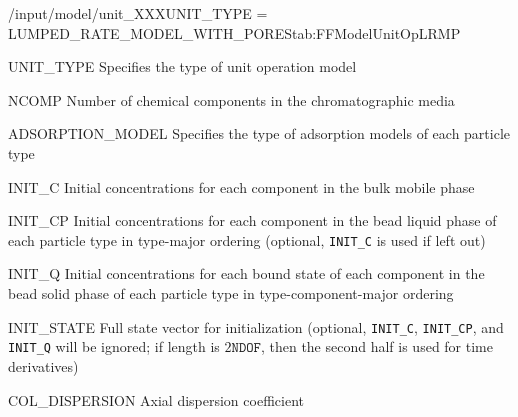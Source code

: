 \begin{condsubgroup}{/input/model/unit\_XXX}{UNIT\_TYPE = LUMPED\_RATE\_MODEL\_WITH\_PORES}{tab:FFModelUnitOpLRMP}
  \begin{dataset}[type=string,range={\texttt{LUMPED\_RATE\_MODEL\_WITH\_PORES}},length=1]{UNIT\_TYPE}
    Specifies the type of unit operation model
  \end{dataset}
  \begin{dataset}[type=int,range={$\geq 1$},length=1]{NCOMP}
    Number of chemical components in the chromatographic media
  \end{dataset}
  \begin{dataset}[type=string,range={See Section~\ref{sec:FFAdsorption}},length={\texttt{NPARTYPE}}]{ADSORPTION\_MODEL}
    Specifies the type of adsorption models of each particle type
  \end{dataset}
  \begin{dataset}[unit=\si{\mol\per\cubic\metre\of{IV}},type=double,range={$\geq 0$},length={\texttt{NCOMP}}]{INIT\_C}
    Initial concentrations for each component in the bulk mobile phase
  \end{dataset}
  \begin{dataset}[unit=\si{\mol\per\cubic\metre\of{MP}},type=double,range={$\geq 0$},length={$\texttt{NPARTYPE} \cdot \texttt{NCOMP}$}]{INIT\_CP}
    Initial concentrations for each component in the bead liquid phase of each particle type in type-major ordering (optional, \texttt{INIT\_C} is used if left out)
  \end{dataset}
  \begin{dataset}[unit=\si{\mol\per\cubic\metre\of{SP}},type=double,range={$\geq 0$},length={\texttt{NTOTALBND}}]{INIT\_Q}
    Initial concentrations for each bound state of each component in the bead solid phase of each particle type in type-component-major ordering
  \end{dataset}
  \begin{dataset}[unit=various,type=double,range={$\mathds{R}$},length={\texttt{NDOF} / $2\texttt{NDOF}$}]{INIT\_STATE}
    Full state vector for initialization (optional, \texttt{INIT\_C}, \texttt{INIT\_CP}, and \texttt{INIT\_Q} will be ignored; if length is $2\texttt{NDOF}$, then the second half is used for time derivatives)
  \end{dataset}
  \begin{dataset}[unit=\si{\square\metre\of{IV}\per\second},type=double,range={$\geq 0$},length={1 / \texttt{NSEC}}]{COL\_DISPERSION}
    Axial dispersion coefficient
  \end{dataset}

\end{condsubgroup}
